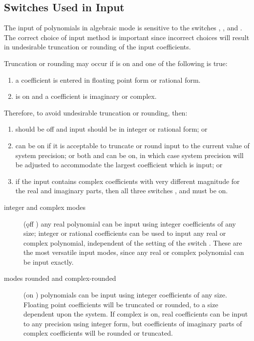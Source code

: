 \subsection{Switches Used in Input}

The input of polynomials in algebraic mode is sensitive to the switches
, , and .  The correct choice of
input method is important since incorrect choices will result in
undesirable truncation or rounding of the input coefficients.

Truncation or rounding may occur if  is on and
one of the following is true:

\begin{enumerate}
\item a coefficient is entered in floating point form or rational form.
\item {} is on and a coefficient is imaginary or complex.
\end{enumerate}

Therefore, to avoid undesirable truncation or rounding, then:

\begin{enumerate}
\item {} should be off and input should be
in integer or rational form; or
\item {} can be on if it is acceptable to truncate or round
input to the current value of system precision; or both  and
 can be on, in which case system precision will be adjusted
to accommodate the largest coefficient which is input; or
\item if the
input contains complex coefficients with very different magnitude for the
real and imaginary parts, then all three switches ,  and
 must be on.
\end{enumerate}

\begin{description}
\item[integer and complex modes] (\k{off} ) any real
polynomial can be input using integer coefficients of any size; integer or
rational coefficients can be used to input any real or complex polynomial,
independent of the setting of the switch .  These are the most
versatile input modes, since any real or complex polynomial can be input
exactly.

\item[modes rounded and complex-rounded] (on ) polynomials can be
input using
integer coefficients of any size.  Floating point coefficients will be
truncated or rounded, to a size dependent upon the system.  If complex
is on, real coefficients can be input to any precision using integer
form, but coefficients of imaginary parts of complex coefficients will
be rounded or truncated.
\end{description}

